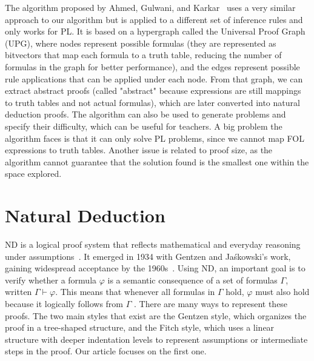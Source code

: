 \documentclass[runningheads]{llncs}
\begin{document}
The algorithm proposed by Ahmed, Gulwani, and Karkar~\cite{IJCAI13} uses a very similar approach to our algorithm but is applied to a different set of inference rules and only works for PL. It is based on a hypergraph called the Universal Proof Graph (UPG), where nodes represent possible formulas (they are represented as bitvectors that map each formula to a truth table, reducing the number of formulas in the graph for better performance), and the edges represent possible rule applications that can be applied under each node. From that graph, we can extract abstract proofs (called "abstract" because expressions are still mappings to truth tables and not actual formulas), which are later converted into natural deduction proofs. The algorithm can also be used to generate problems and specify their difficulty, which can be useful for teachers. A big problem the algorithm faces is that it can only solve PL problems, since we cannot map FOL expressions to truth tables. Another issue is related to proof size, as the algorithm cannot guarantee that the solution found is the smallest one within the space explored.

\section{Natural Deduction}

ND is a logical proof system that reflects mathematical and everyday reasoning under assumptions~\cite{nd-mancosu}. It emerged in 1934 with Gentzen and Jaśkowski's work, gaining widespread acceptance by the 1960s~\cite{Pelletier1999-FRAABH}. Using ND, an important goal is to verify whether a formula \(\varphi\) is a semantic consequence of a set of formulas \(\Gamma\), written \(\Gamma \vdash \varphi\). This means that whenever all formulas in \(\Gamma\) hold, \(\varphi\) must also hold because it logically follows from \(\Gamma\) \cite{gouveia_lgica1, gouveia_lgica2}. There are many ways to represent these proofs. The two main styles that exist are the Gentzen style, which organizes the proof in a tree-shaped structure, and the Fitch style, which uses a linear structure with deeper indentation levels to represent assumptions or intermediate steps in the proof. Our article focuses on the first one. 
\end{document}
